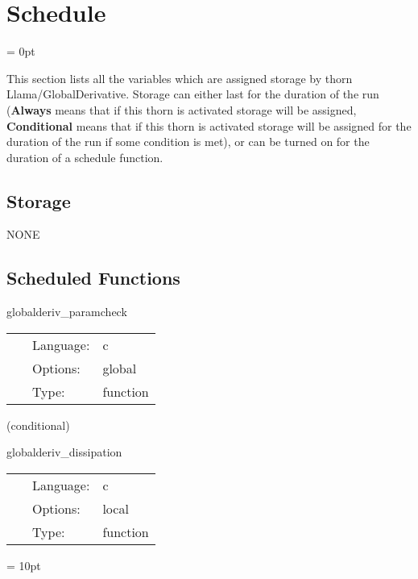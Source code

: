 
\section{Schedule} 


\parskip = 0pt


\noindent This section lists all the variables which are assigned storage by thorn Llama/GlobalDerivative.  Storage can either last for the duration of the run ({\bf Always} means that if this thorn is activated storage will be assigned, {\bf Conditional} means that if this thorn is activated storage will be assigned for the duration of the run if some condition is met), or can be turned on for the duration of a schedule function.


\subsection*{Storage}NONE
\subsection*{Scheduled Functions}
\vspace{5mm}


\hspace{5mm} globalderiv\_paramcheck 

\hspace{5mm}{\it check parameters } 


\hspace{5mm}

 \begin{tabular*}{160mm}{cll} 
~ & Language:  & c \\ 
~ & Options:  & global \\ 
~ & Type:  & function \\ 
\end{tabular*} 


\vspace{5mm}

   (conditional) 

\hspace{5mm} globalderiv\_dissipation 

\hspace{5mm}{\it apply global dissipation to registered variables } 


\hspace{5mm}

 \begin{tabular*}{160mm}{cll} 
~ & Language:  & c \\ 
~ & Options:  & local \\ 
~ & Type:  & function \\ 
\end{tabular*} 



\vspace{5mm}\parskip = 10pt 
